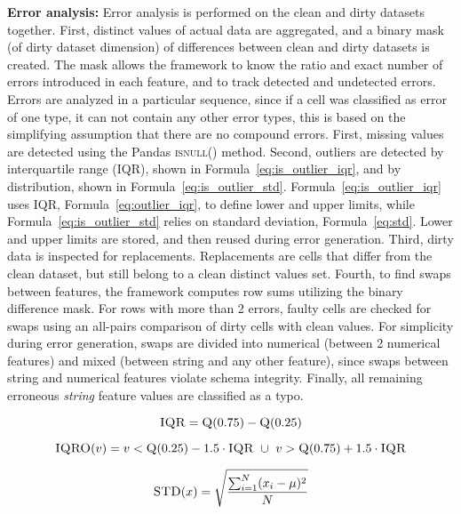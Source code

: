 \textbf{Error analysis:} 
Error analysis is performed on the clean and dirty datasets together.
First, distinct values of actual data are aggregated, and a binary mask (of dirty dataset dimension) of differences between clean and dirty datasets is created.
The mask allows the framework to know the ratio and exact number of errors introduced in each feature, and to track detected and undetected errors. 
Errors are analyzed in a particular sequence, since if a cell was classified as error of one type, it can not contain any other error types, this is based on the simplifying assumption that there are no compound errors.
First, missing values are detected using the Pandas \textsc{isnull()} method. 
Second, outliers are detected by interquartile range (IQR), shown in Formula~\ref{eq:is_outlier_iqr}, and by distribution, shown in Formula~\ref{eq:is_outlier_std}. 
Formula~\ref{eq:is_outlier_iqr} uses IQR, Formula~\ref{eq:outlier_iqr}, to define lower and upper limits, while Formula~\ref{eq:is_outlier_std} relies on standard deviation, Formula~\ref{eq:std}. 
Lower and upper limits are stored, and then reused during error generation. 
Third, dirty data is inspected for replacements. 
Replacements are cells that differ from the clean dataset, but still belong to a clean distinct values set.
Fourth, to find swaps between features, the framework computes row sums utilizing the binary difference mask. 
For rows with more than 2 errors, faulty cells are checked for swaps using an all-pairs comparison of dirty cells with clean values. 
For simplicity during error generation, swaps are divided into numerical (between 2 numerical features) and mixed (between string and any other feature), since swaps between string and numerical features violate schema integrity.
Finally, all remaining erroneous \emph{string} feature values are classified as a typo.

\begin{equation}
\label{eq:outlier_iqr}
\textsc{IQR} = \textsc{Q}(0.75) - \textsc{Q}(0.25)  
\end{equation}

\begin{equation}
\label{eq:is_outlier_iqr}
\textsc{IQRO}(v) =  v < \textsc{Q}(0.25) - 1.5 \cdot \textsc{IQR} \ \cup \  v >  \textsc{Q}(0.75) + 1.5 \cdot \textsc{IQR}
\end{equation}

\begin{equation}
    \label{eq:std}
    \textsc{STD}(x) = \sqrt{\frac{\sum_{i=1}^{N}(x_{i}-\mu)^{2}}{N}}
\end{equation}

